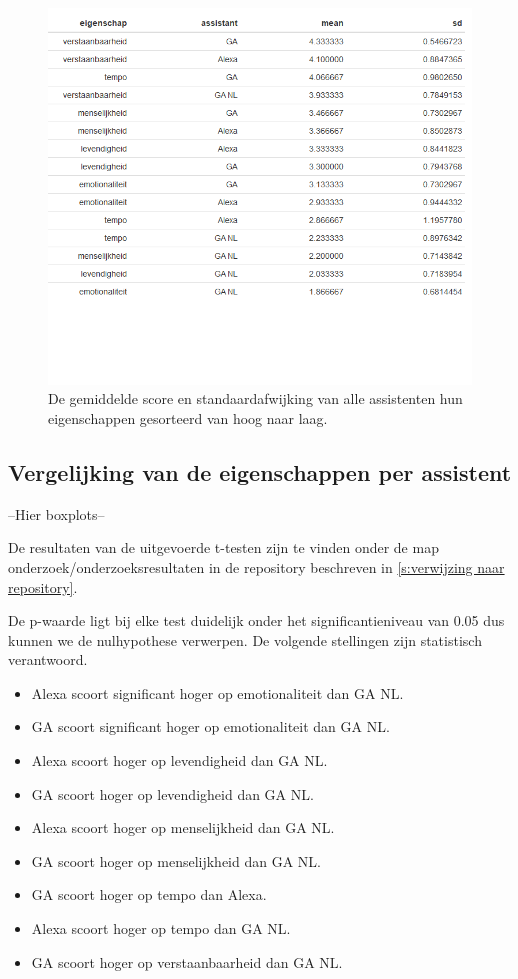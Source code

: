 \begin{figure}[h]
    \includegraphics[width=0.9\linewidth]{../onderzoek/onderzoeksresultaten/vergelijking_assistenten_per_eigenschap/table_mean_sd_scores}
    \caption{De gemiddelde score en standaardafwijking van alle assistenten hun eigenschappen gesorteerd van hoog naar laag.}
    \label{fig:table-mean-sd-scores}
\end{figure}

\subsection{Vergelijking van de eigenschappen per assistent}
--Hier boxplots--

De resultaten van de uitgevoerde t-testen zijn te vinden onder de map onderzoek/onderzoeksresultaten in de repository beschreven in \ref{s:verwijzing naar repository}.

De p-waarde ligt bij elke test duidelijk onder het significantieniveau van 0.05 dus kunnen we de nulhypothese verwerpen. De volgende stellingen zijn statistisch verantwoord.
\begin{itemize}
    \item Alexa scoort significant hoger op emotionaliteit dan GA NL.
    \item GA scoort significant hoger op emotionaliteit dan GA NL.
    \item Alexa scoort hoger op levendigheid dan GA NL.
    \item GA scoort hoger op levendigheid dan GA NL.
    \item Alexa scoort hoger op menselijkheid dan GA NL.
    \item GA scoort hoger op menselijkheid dan GA NL.
    \item GA scoort hoger op tempo dan Alexa.
    \item Alexa scoort hoger op tempo dan GA NL.
    \item GA scoort hoger op verstaanbaarheid dan GA NL.
\end{itemize}

